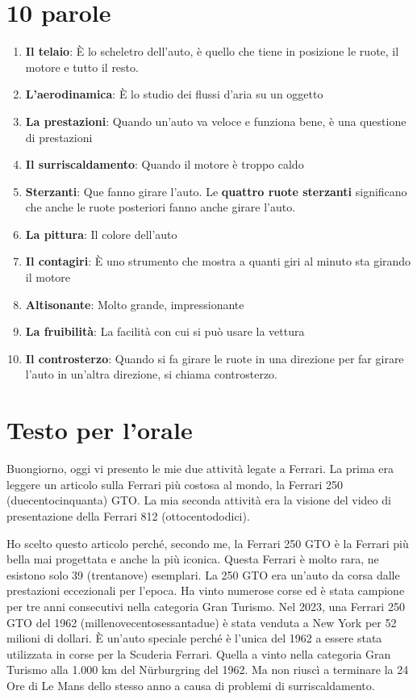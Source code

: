 \documentclass[12pt]{article}
\begin{document}
\section*{10 parole}
\begin{enumerate}
    \item \textbf{Il telaio}: È lo scheletro dell'auto, è quello che tiene in posizione le ruote, il motore e tutto il resto.
    \item \textbf{L'aerodinamica}: È lo studio dei flussi d'aria su un oggetto
    \item \textbf{La prestazioni}: Quando un'auto va veloce e funziona bene, è una questione di prestazioni
    \item \textbf{Il surriscaldamento}: Quando il motore è troppo caldo
    \item \textbf{Sterzanti}: Que fanno girare l'auto. Le \textbf{quattro ruote sterzanti} significano che anche le ruote posteriori fanno anche girare l'auto.
    \item \textbf{La pittura}: Il colore dell'auto
    \item \textbf{Il contagiri}: È uno strumento che mostra a quanti giri al minuto sta girando il motore
    \item \textbf{Altisonante}: Molto grande, impressionante
    \item \textbf{La fruibilità}: La facilità con cui si può usare la vettura
    \item \textbf{Il controsterzo}: Quando si fa girare le ruote in una direzione per far girare l'auto in un'altra direzione, si chiama controsterzo.
\end{enumerate}
\newpage
\section*{Testo per l'orale}
Buongiorno, oggi vi presento le mie due attività legate a Ferrari. La prima era leggere un articolo sulla Ferrari più costosa al mondo, la Ferrari 250 (duecentocinquanta) GTO. La mia seconda attività era la visione del video di presentazione della Ferrari 812 (ottocentododici). %

Ho scelto questo articolo perché, secondo me, la Ferrari 250 GTO è la Ferrari più bella mai progettata e anche la più iconica. Questa Ferrari è molto rara, ne esistono solo 39 (trentanove) esemplari. La 250 GTO era un'auto da corsa dalle prestazioni eccezionali per l'epoca. Ha vinto numerose corse ed è stata campione per tre anni consecutivi nella categoria Gran Turismo. Nel 2023, una Ferrari 250 GTO del 1962 (millenovecentosessantadue) è stata venduta a New York per 52 milioni di dollari. È un’auto speciale perché è l'unica del 1962 a essere stata utilizzata in corse per la Scuderia Ferrari. Quella a vinto nella categoria Gran Turismo alla 1.000 km del Nürburgring del 1962. Ma non riuscì a terminare la 24 Ore di Le Mans dello stesso anno a causa di problemi di surriscaldamento.
\end{document}
